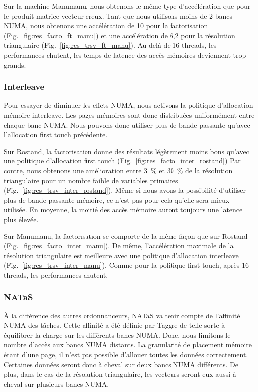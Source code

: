 Sur la machine Manumanu, nous obtenons le même type d'accélération que pour le produit matrice vecteur creux.
%
Tant que nous utilisons moins de 2 bancs NUMA, nous obtenons une accélération de 10 pour la factorisation (Fig.~\ref{fig:res_facto_ft_manu}) et une accélération de 6,2 pour la résolution triangulaire (Fig.~\ref{fig:res_trsv_ft_manu}).
%
Au-delà de 16 threads, les performances chutent, les temps de latence des accès mémoires deviennent trop grands.


\subsubsection{Interleave}
Pour essayer de diminuer les effets NUMA, nous activons la politique d'allocation mémoire interleave.
%
Les pages mémoires sont donc distribuées uniformément entre chaque banc NUMA.
%
Nous pouvons donc utiliser plus de bande passante qu'avec l'allocation first touch précédente.


Sur Rostand, la factorisation donne des résultats légèrement moins bons qu'avec une politique d'allocation first touch (Fig.~\ref{fig:res_facto_inter_rostand})
%
Par contre, nous obtenons une amélioration entre 3~\% et 30~\% de la résolution triangulaire pour un nombre faible de variables primaires (Fig.~\ref{fig:res_trsv_inter_rostand}).
%
Même si nous avons la possibilité d'utiliser plus de bande passante mémoire, ce n'est pas pour cela qu'elle sera mieux utilisée.
%
En moyenne, la moitié des accès mémoire auront toujours une latence plus élevée.



Sur Manumanu, la factorisation se comporte de la même façon que sur Rostand (Fig.~\ref{fig:res_facto_inter_manu}).
%
De même, l'accélération maximale de la résolution triangulaire est meilleure avec une politique d'allocation interleave (Fig.~\ref{fig:res_trsv_inter_manu}).
%
Comme pour la politique first touch, après 16 threads, les performances chutent.


\subsubsection{NATaS}
\`A la différence des autres ordonnanceurs, NATaS va tenir compte de l'affinité NUMA des tâches.
%
Cette affinité a été définie par Taggre de telle sorte à équilibrer la charge sur les différents bancs NUMA.
%
Donc, nous limitons le nombre d'accès aux bancs NUMA distants.
%
La granularité de placement mémoire étant d'une page, il n'est pas possible d'allouer toutes les données correctement.
%
Certaines données seront donc à cheval sur deux bancs NUMA différents.
%
De plus, dans le cas de la résolution triangulaire, les vecteurs seront eux aussi à cheval sur plusieurs bancs NUMA.



